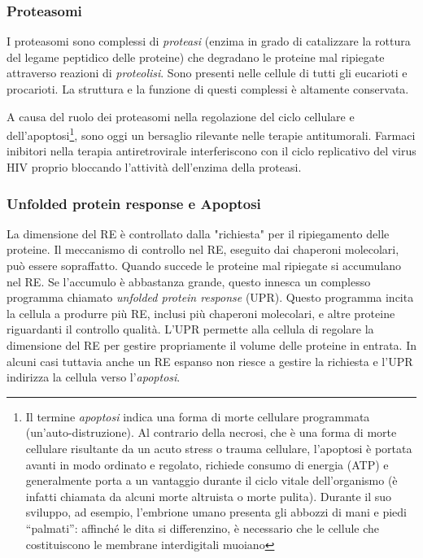 {{\subsubsection{Proteasomi}
\par I proteasomi sono complessi di \textit{proteasi} (enzima in grado di catalizzare la rottura del legame peptidico delle proteine) che degradano le proteine mal ripiegate attraverso reazioni di \textit{proteolisi}. Sono presenti nelle cellule di tutti gli eucarioti e procarioti. La struttura e la funzione di questi complessi è altamente conservata.

\par A causa del ruolo dei proteasomi nella regolazione del ciclo cellulare e dell'apoptosi\footnote{Il termine \textit{apoptosi} indica una forma di morte cellulare programmata (un'auto-distruzione). Al contrario della necrosi, che è una forma di morte cellulare risultante da un acuto stress o trauma cellulare, l'apoptosi è portata avanti in modo ordinato e regolato, richiede consumo di energia (ATP) e generalmente porta a un vantaggio durante il ciclo vitale dell'organismo (è infatti chiamata da alcuni morte altruista o morte pulita). Durante il suo sviluppo, ad esempio, l'embrione umano presenta gli abbozzi di mani e piedi “palmati”: affinché le dita si differenzino, è necessario che le cellule che costituiscono le membrane interdigitali muoiano}, sono oggi un bersaglio rilevante nelle terapie antitumorali. Farmaci inibitori nella terapia antiretrovirale interferiscono con il ciclo replicativo del virus HIV proprio bloccando l'attività dell'enzima della proteasi.

}
\subsubsection{Unfolded protein response e Apoptosi}
{

La dimensione del RE è controllato dalla "richiesta" per il ripiegamento delle proteine. Il meccanismo di controllo nel RE, eseguito dai chaperoni molecolari, può essere sopraffatto. Quando succede le proteine mal ripiegate si accumulano nel RE. 
Se l'accumulo è abbastanza grande, questo innesca un complesso programma chiamato \textit{unfolded protein response} (UPR). Questo programma incita la cellula a produrre più RE, inclusi più chaperoni molecolari, e altre proteine riguardanti il controllo qualità. L'UPR permette alla cellula di regolare la dimensione del RE per gestire propriamente il volume delle proteine in entrata. In alcuni casi tuttavia anche un RE espanso non riesce a gestire la richiesta e l'UPR indirizza la cellula verso l'\textit{apoptosi}.

}}
